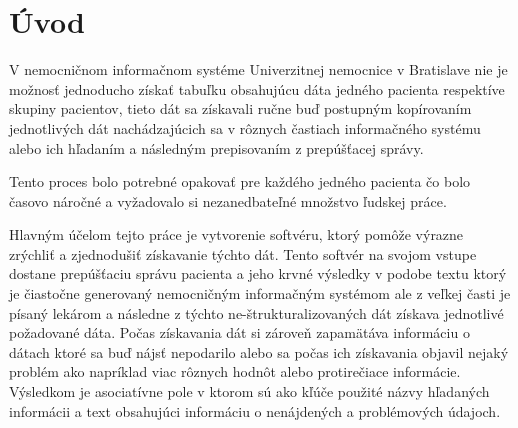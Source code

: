 \chapter*{Úvod} %

V nemocničnom informačnom systéme Univerzitnej nemocnice v Bratislave nie je možnosť jednoducho získať tabuľku obsahujúcu dáta jedného pacienta respektíve skupiny pacientov, tieto dát sa získavali ručne buď postupným kopírovaním jednotlivých dát nachádzajúcich sa v rôznych častiach informačného systému alebo ich hľadaním a následným prepisovaním z prepúšťacej správy.

Tento proces bolo potrebné opakovať pre každého jedného pacienta čo bolo časovo náročné a vyžadovalo si nezanedbateľné množstvo ľudskej práce.

Hlavným účelom tejto práce je vytvorenie softvéru, ktorý pomôže výrazne zrýchliť a zjednodušiť získavanie týchto dát. Tento softvér na svojom vstupe dostane prepúšťaciu správu pacienta a jeho krvné výsledky v podobe textu ktorý je čiastočne generovaný nemocničným informačným systémom ale z veľkej časti je písaný lekárom a následne z týchto ne-štrukturalizovaných dát získava jednotlivé požadované dáta. Počas získavania dát si zároveň zapamätáva informáciu o dátach ktoré sa buď nájsť nepodarilo alebo sa počas ich získavania objavil nejaký problém ako napríklad viac rôznych hodnôt alebo protirečiace informácie. Výsledkom je asociatívne pole v ktorom sú ako kľúče použité názvy hľadaných informácii a text obsahujúci informáciu o nenájdených a problémových údajoch. 

